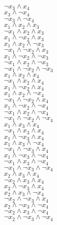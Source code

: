 \documentclass[12pt, fullpage,letterpaper]{article}
\begin{document}
\begin{enumerate}
\begin{enumerate}
\begin{multicols}{3}
$\neg x_3 \wedge x_4$\\
$x_3 \wedge \neg x_4$\\
$\neg x_3 \wedge \neg x_4$\\
$x_1 \wedge x_2 \wedge x_3$\\
$\neg x_1 \wedge x_2 \wedge x_3$\\
$x_1 \wedge \neg x_2 \wedge x_3$\\
$x_1 \wedge x_2 \wedge \neg x_3$\\
$\neg x_1 \wedge \neg x_2 \wedge x_3$\\
$x_1 \wedge \neg x_2 \wedge \neg x_3$\\
$\neg x_1 \wedge x_2 \wedge \neg x_3$\\
$\neg x_1 \wedge \neg x_2 \wedge \neg x_3$\\
$x_1 \wedge x_2 \wedge x_4$\\
$\neg x_1 \wedge x_2 \wedge x_4$\\
$x_1 \wedge \neg x_2 \wedge x_4$\\
$x_1 \wedge x_2 \wedge \neg x_4$\\
$\neg x_1 \wedge \neg x_2 \wedge x_4$\\
$x_1 \wedge \neg x_2 \wedge \neg x_4$\\
$\neg x_1 \wedge x_2 \wedge \neg x_4$\\
$\neg x_1 \wedge \neg x_2 \wedge \neg x_4$\\
$x_1 \wedge x_3 \wedge x_4$\\
$\neg x_1 \wedge x_3 \wedge x_4$\\
$x_1 \wedge \neg x_3 \wedge x_4$\\
$x_1 \wedge x_3 \wedge \neg x_4$\\
$\neg x_1 \wedge \neg x_3 \wedge x_4$\\
$x_1 \wedge \neg x_3 \wedge \neg x_4$\\
$\neg x_1 \wedge x_3 \wedge \neg x_4$\\
$\neg x_1 \wedge \neg x_3 \wedge \neg x_4$\\
$x_2 \wedge x_3 \wedge x_4$\\
$\neg x_2 \wedge x_3 \wedge x_4$\\
$x_2 \wedge \neg x_3 \wedge x_4$\\
$x_2 \wedge x_3 \wedge \neg x_4$\\
$\neg x_2 \wedge \neg x_3 \wedge x_4$\\
$x_2 \wedge \neg x_3 \wedge \neg x_4$\\
$\neg x_2 \wedge x_3 \wedge \neg x_4$\\
$\neg x_2 \wedge \neg x_3 \wedge \neg x_4$\\

\end{multicols}
\end{enumerate}
\end{enumerate}
\end{document}
